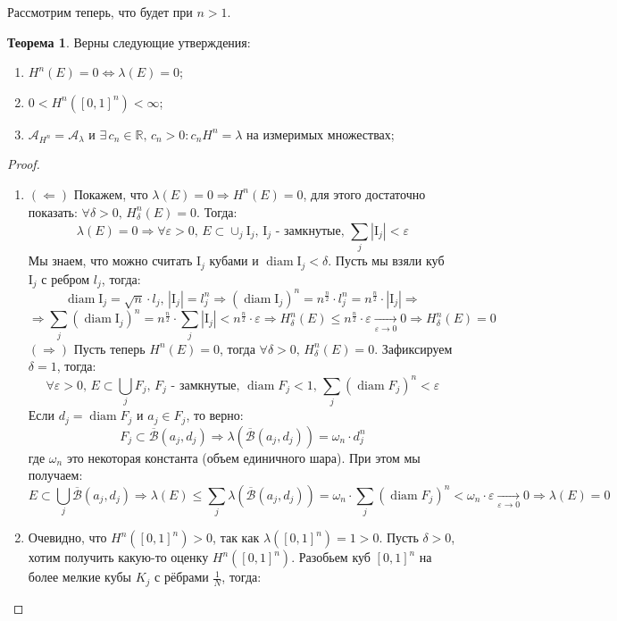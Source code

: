\documentclass[12pt]{article}
\newcommand{\MR}{\mathbb{R}}
\newcommand{\MI}{\mathrm{I}}
\newcommand{\MA}{\mathcal{A}}
\newcommand{\MB}{\mathcal{B}}
\newcommand{\VE}{\varepsilon}
\theoremstyle{definition}
\newtheorem{theorem}{Теорема}
\DeclareMathOperator{\diam}{\text{diam}}
\newcommand{\ddsum}[2]{\displaystyle\sum\limits_{#1}^{#2}}
\newcommand{\ovl}[1]{\overline{#1}}
\begin{document}
Рассмотрим теперь, что будет при $n > 1$.
\begin{theorem}
	Верны следующие утверждения:
	\begin{enumerate}[label = \arabic*)]
		\item $H^n(E) = 0 \Leftrightarrow \lambda(E) = 0$;
		\item $0< H^n([0,1]^n) < \infty$;
		\item $\MA_{H^n} = \MA_\lambda$ и $\exists \, c_n \in \MR, \, c_n > 0 \colon c_n H^n = \lambda$ на измеримых множествах;
	\end{enumerate}
\end{theorem}
\begin{proof}\hfill
	\begin{enumerate}[label=\arabic*)]
		\item $(\Leftarrow)$ Покажем, что $\lambda(E) = 0 \Rightarrow H^n(E) = 0$, для этого достаточно показать: $\forall \delta > 0,\, H_\delta^n(E) = 0$. Тогда:
		$$
			\lambda(E) = 0 \Rightarrow \forall \VE > 0, \, E \subset \cup_j \MI_j, \, \MI_j \text{ - замкнутые}, \, \ddsum{j}{}|\MI_j| < \VE
		$$
		Мы знаем, что можно считать $\MI_j$ кубами и $\diam{\MI_j} < \delta$. Пусть мы взяли куб $\MI_j$ с ребром $l_j$, тогда: 
		$$
			\diam{\MI_j} = \sqrt{n}{\cdot}l_j, \, |\MI_j| = l_j^n \Rightarrow(\diam{\MI_j})^n = n^{\tfrac{n}{2}}{\cdot}l_j^n = n^{\tfrac{n}{2}}{\cdot}|\MI_j| \Rightarrow 
		$$
		$$	
			\Rightarrow \ddsum{j}{}(\diam{\MI_j})^n = n^{\tfrac{n}{2}}{\cdot}\ddsum{j}{}|\MI_j| < n^{\tfrac{n}{2}}{\cdot}\VE \Rightarrow H_\delta^n(E) \leq n^{\tfrac{n}{2}}{\cdot}\VE \xrightarrow[\VE \to 0]{} 0 \Rightarrow H_\delta^n(E) = 0
		$$
		$(\Rightarrow)$ Пусть теперь $H^n(E) = 0$, тогда $\forall \delta > 0, \, H_\delta^n(E) = 0$. Зафиксируем $\delta = 1$, тогда:
		$$
			\forall \VE > 0, \, E \subset \bigcup\limits_j F_j,\, F_j \text{ - замкнутые}, \, \diam{F_j} < 1, \, \ddsum{j}{}(\diam{F_j})^n < \VE
		$$
		Если $d_j = \diam{F_j}$ и $a_j \in F_j$, то верно: 
		$$
			F_j \subset \ovl{\MB}(a_j,d_j) \Rightarrow \lambda(\ovl{\MB}(a_j,d_j)) = \omega_n{\cdot}d_j^n
		$$ 
		где $\omega_n$ это некоторая константа (объем единичного шара). При этом мы получаем:
		$$
			E \subset \bigcup\limits_j \ovl{\MB}(a_j, d_j) \Rightarrow \lambda(E) \leq \ddsum{j}{}\lambda(\ovl{\MB}(a_j, d_j)) =  \omega_n{\cdot}\ddsum{j}{}(\diam{F_j})^n < \omega_n{\cdot}\VE \xrightarrow[\VE \to 0]{} 0 \Rightarrow \lambda(E) = 0
		$$
		\item Очевидно, что $H^n([0,1]^n) > 0$, так как $\lambda([0,1]^n) = 1 > 0$. Пусть $\delta > 0$, хотим получить какую-то оценку $H^n([0,1]^n)$. Разобьем куб $[0,1]^n$ на более мелкие кубы $K_j$ с рёбрами $\tfrac{1}{N}$, тогда: 

\end{enumerate}
\end{proof}
\end{document}
